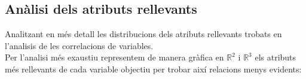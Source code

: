\documentclass[a4paper, 11pt]{article}
\begin{document}
\subsection{Anàlisi dels atributs rellevants}\label{analisis_atributs}
Analitzant en més detall les distribucions dels atributs rellevants trobats en l'analisis de les correlacions de variables.\\
Per l'analisi més exaustiu representem de manera gràfica en $\mathbb{R}^2$ i $\mathbb{R}^3$ els atributs més rellevants de cada variable objectiu per trobar així relacions menys evidents:
\begin{figure}[h]
    \centering
  \label{fig:colores}
\end{figure}
\end{document}
